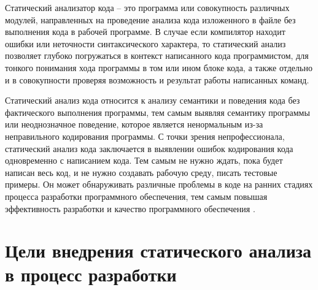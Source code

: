 Статический анализатор кода -- это программа или совокупность различных модулей, направленных на проведение анализа кода изложенного в файле без выполнения кода в рабочей программе. В случае если компилятор находит ошибки или неточности синтаксического характера, то статический анализ позволяет глубоко погружаться в контекст написанного кода программистом, для тонкого понимания хода программы в том или ином блоке кода, а также отдельно и в совокупности проверяя возможность и результат работы написанных команд. 

Статический анализ кода относится к анализу семантики и поведения кода без фактического выполнения программы, тем самым выявляя семантику программы или неоднозначное поведение, которое является ненормальным из-за неправильного кодирования программы. С точки зрения непрофессионала, статический анализ кода заключается в выявлении ошибок кодирования кода одновременно с написанием кода. Тем самым не нужно ждать, пока будет написан весь код, и не нужно создавать рабочую среду, писать тестовые примеры. Он может обнаруживать различные проблемы в коде на ранних стадиях процесса разработки программного обеспечения, тем самым повышая эффективность разработки и качество программного обеспечения \cite{4,5}.


\section{Цели внедрения статического анализа в процесс разработки}

